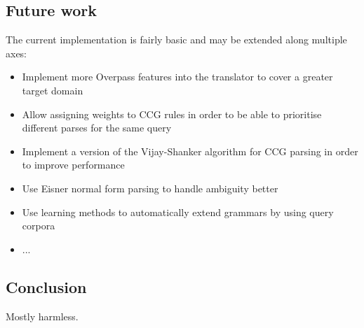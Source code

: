 \documentclass[main.tex]{subfiles}
\begin{document}
\subsection{Future work}
The current implementation is fairly basic and may be extended along multiple
axes:

\begin{itemize}
    \item Implement more Overpass features into the translator to cover a greater
        target domain
    \item Allow assigning weights to CCG rules in order to be able to prioritise
        different parses for the same query
    \item Implement a version of the Vijay-Shanker algorithm for CCG parsing
        in order to improve performance
    \item Use Eisner normal form parsing to handle ambiguity better
    \item Use learning methods to automatically extend grammars by using
        query corpora
    \item ...
\end{itemize}

\subsection{Conclusion}
Mostly harmless.
\end{document}
